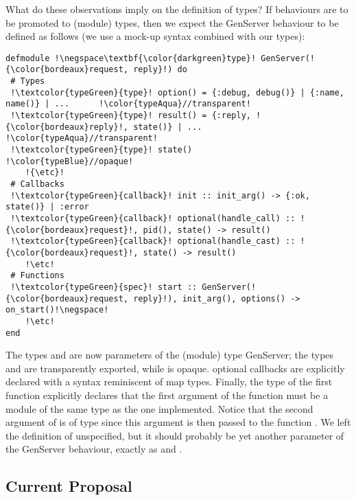 \documentclass[a4paper,10pt]{article}
\begin{document}
What do these observations imply on the definition of types? If
behaviours are to be promoted to (module) types, then we expect the
GenServer behaviour to be defined as follows (we use a mock-up syntax
combined with our types):
\begin{verbatim}
defmodule !\negspace\textbf{\color{darkgreen}type}! GenServer(!{\color{bordeaux}request, reply}!) do
 # Types
 !\textcolor{typeGreen}{type}! option() = {:debug, debug()} | {:name, name()} | ...      !\color{typeAqua}//transparent!
 !\textcolor{typeGreen}{type}! result() = {:reply, !{\color{bordeaux}reply}!, state()} | ...                 !\color{typeAqua}//transparent!
 !\textcolor{typeGreen}{type}! state()                                                   !\color{typeBlue}//opaque!
    !{\etc}!
 # Callbacks
 !\textcolor{typeGreen}{callback}! init :: init_arg() -> {:ok, state()} | :error      
 !\textcolor{typeGreen}{callback}! optional(handle_call) :: !{\color{bordeaux}request}!, pid(), state() -> result() 
 !\textcolor{typeGreen}{callback}! optional(handle_cast) :: !{\color{bordeaux}request}!, state() -> result()        
    !\etc!
 # Functions
 !\textcolor{typeGreen}{spec}! start :: GenServer(!{\color{bordeaux}request, reply}!), init_arg(), options() -> on_start()!\negspace!
    !\etc!
end
\end{verbatim}
The types  and  are now parameters of the (module) type GenServer; the types  and  are transparently exported, while  is opaque. optional callbacks are explicitly declared with a syntax reminiscent of map types. Finally, the type of the  first  function explicitly declares that the first argument of the  function must be a module of the same type as the one implemented. Notice that the second argument of  is of type  since this argument is then passed to the function . We left the definition of  unspecified, but it should probably be yet another parameter of the GenServer behaviour, exactly as   and .  



\subsection{Current Proposal}
\end{document}
